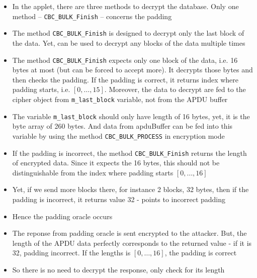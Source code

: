 \documentclass[11pt,a4paper]{article}
\begin{document}
\begin{itemize}
\item In the applet, there are three methods to decrypt the database. Only one method -- \texttt{CBC\_BULK\_Finish} -- concerns the padding
\item The method \texttt{CBC\_BULK\_Finish} is designed to decrypt only the last block of the data. Yet, can be used to decrypt any blocks of the data multiple times 
\item The method \texttt{CBC\_BULK\_Finish} expects only one block of the data, i.e. 16 bytes at most (but can be forced to accept more). It decrypts those bytes and then checks the padding. If the padding is correct, it returns index where padding starts, i.e. $[0,\dots,15]$. Moreover, the data to decrypt are fed to the cipher object from \texttt{m\_last\_block} variable, not from the APDU buffer
\item The variable \texttt{m\_last\_block} should only have length of 16 bytes, yet, it is the byte array of 260 bytes. And data from apduBuffer can be fed into this variable by using the method \texttt{CBC\_BULK\_PROCESS} in encryption mode
\item If the padding is incorrect, the method \texttt{CBC\_BULK\_Finish} returns the length of encrypted data. Since it expects the 16 bytes, this should not be distinguishable from the index where padding starts $[0,\dots,16]$
\item Yet, if we send more blocks there, for instance 2 blocks, 32 bytes, then if the padding is incorrect, it returns value 32 - points to incorrect padding
\item Hence the padding oracle occurs
\item The reponse from padding oracle is sent encrypted to the attacker. But, the length of the APDU data perfectly corresponds to the returned value - if it is 32, padding incorrect. If the lengths is $[0,\dots,16]$, the padding is correct
\item So there is no need to decrypt the response, only check for its length
\end{itemize}
\end{document}
